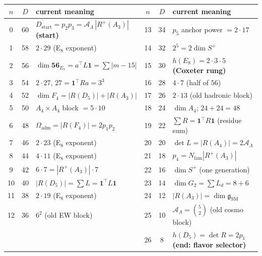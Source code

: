 \documentclass[11pt,a4paper]{article}
\newcommand{\Nfam}{N_{\mathrm{fam}}}
\newcommand{\Oadm}{\Omega_{\mathrm{adm}}}
\newcommand{\AL}{\mathcal A_\Lambda}
\theoremstyle{definition}
\renewcommand{\arraystretch}{1.15}
\begin{document}
\begin{center}\scriptsize
\renewcommand{\arraystretch}{1.04}
\begin{tabularx}{\linewidth}{@{}cc>{\raggedright\arraybackslash}p{4.9cm}cc>{\raggedright\arraybackslash}p{4.9cm}@{}}
\toprule
$n$ & $D$ & \textbf{current meaning} & $n$ & $D$ & \textbf{current meaning} \\
\midrule
0 & 60 & $D_{\mathrm{start}}=p_2p_3=\AL\,|R^+\!(A_3)|$ \textbf{(start)} & 13 & 34 & $p_5$ anchor power $=2\cdot17$ \\
1 & 58 & $2\cdot29$ (E$_8$ exponent) & 14 & 32 & $2^5=2\dim S^+$ \\
2 & 56 & $\dim\mathbf{56}_{E_7}=a^\top L\mathbf 1=\sum|m{-}15|$ & 15 & 30 & $h(E_8)=2{\cdot}3{\cdot}5$ \textbf{(Coxeter rung)} \\
3 & 54 & $2\cdot27$, $27=\mathbf 1^\top Ra=3^3$ & 16 & 28 & $4\cdot7$ (half of $56$) \\
4 & 52 & $\dim F_4=|R(D_5)|{+}|R(A_3)|$ & 17 & 26 & $2\cdot13$ (old hadronic block) \\
5 & 50 & $A_4{\times}A_4$ block $=5{\cdot}10$ & 18 & 24 & $\dim A_4$; $24{+}24{=}48$ \\
6 & 48 & $\Oadm=|R(F_4)|=2p_1p_2$ & 19 & 22 & $\sum R=\mathbf 1^\top R\mathbf 1$ (residue sum) \\
7 & 46 & $2\cdot23$ (E$_8$ exponent) & 20 & 20 & $\det L=|R(A_4)|=2\AL$ \\
8 & 44 & $4\cdot11$ (E$_8$ exponent) & 21 & 18 & $p_4=\Nfam|R^+\!(A_3)|$ \\
9 & 42 & $6\cdot7=|R^+\!(A_3)|\cdot7$ & 22 & 16 & $\dim S^+$ (one generation) \\
10 & 40 & $|R(D_5)|=\sum L=\mathbf 1^\top L\mathbf 1$ & 23 & 14 & $\dim G_2=\sum L_d=8{+}6$ \\
11 & 38 & $2\cdot19$ (E$_8$ exponent) & 24 & 12 & $|R(A_3)|=\dim\mathfrak g_{\mathrm{SM}}$ \\
12 & 36 & $6^2$ (old EW block) & 25 & 10 & $\AL=\binom52$ (old cosmo block) \\
   &    &                                & 26 & \phantom{0}8 & $h(D_5)=\det R=2p_1$ \textbf{(end: flavor selector)} \\
\bottomrule
\end{tabularx}
\end{center}
\end{document}
